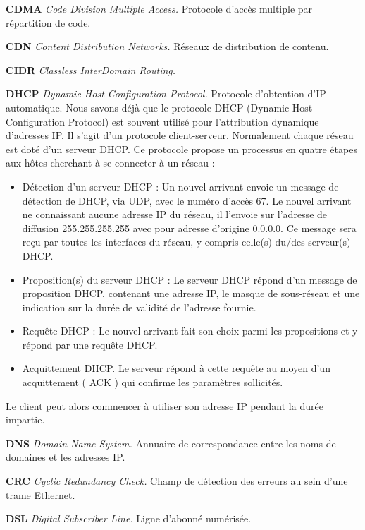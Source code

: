\textbf{CDMA} \textit{Code Division Multiple Access.} Protocole d’accès multiple par répartition de code.



\textbf{CDN} \textit{Content Distribution Networks.} Réseaux de distribution de contenu.



\textbf{CIDR} \textit{Classless InterDomain Routing.}



\textbf{DHCP} \textit{Dynamic Host Configuration Protocol.} Protocole d’obtention d’IP automatique.
Nous savons déjà que le protocole DHCP (Dynamic Host Configuration Protocol) est souvent utilisé pour l’attribution dynamique d’adresses IP. Il s’agit d’un protocole client-serveur. Normalement chaque réseau est doté d’un serveur DHCP. Ce protocole propose un processus en quatre étapes aux hôtes cherchant à se connecter à un réseau :
\begin{itemize}
	\item Détection d’un serveur DHCP : Un nouvel arrivant envoie un message de détection de DHCP, via UDP, avec le numéro d’accès 67. Le nouvel arrivant ne connaissant aucune adresse IP du réseau, il l’envoie sur l’adresse de diffusion 255.255.255.255 avec pour adresse d’origine 0.0.0.0. Ce message sera reçu par toutes les interfaces du réseau, y compris celle(s) du/des serveur(s) DHCP.
	\item Proposition(s) du serveur DHCP : Le serveur DHCP répond d’un message de proposition DHCP, contenant une adresse IP, le masque de sous-réseau et une indication sur la durée de validité de l’adresse fournie.
	\item Requête DHCP : Le nouvel arrivant fait son choix parmi les propositions et y répond par une requête DHCP.
	\item Acquittement DHCP. Le serveur répond à cette requête au moyen d’un acquittement ( ACK ) qui confirme les paramètres sollicités.
\end{itemize}
Le client peut alors commencer à utiliser son adresse IP pendant la durée impartie.


\textbf{DNS} \textit{Domain Name System.} Annuaire de correspondance entre les noms de domaines et les adresses IP.



\textbf{CRC} \textit{Cyclic Redundancy Check.} Champ de détection des erreurs au sein d’une trame Ethernet.



\textbf{DSL} \textit{Digital Subscriber Line.} Ligne d’abonné numérisée.



